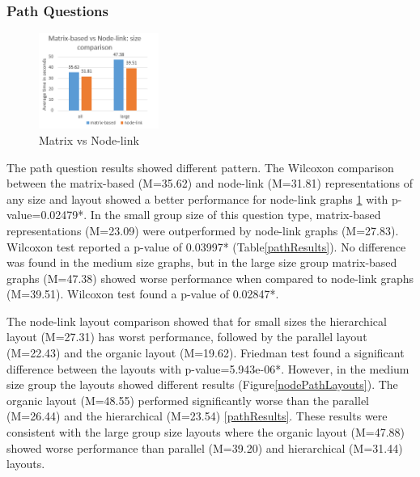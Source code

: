 \documentclass{l4proj}
\begin{document}
\subsubsection{Path Questions}

\begin{figure}
	\centering
	\vspace{-10mm}
    \includegraphics[width=0.35\textwidth]{images/pathComparison.PNG}
    \caption{Matrix vs Node-link} 
	\label{pathComparison}
\end{figure}

The path question results showed different pattern. The Wilcoxon comparison between the matrix-based (M=35.62) and node-link (M=31.81) representations of any size and layout showed a better performance for node-link graphs \ref{pathComparison} with p-value=0.02479*. In the small group size of this question type, matrix-based representations (M=23.09) were outperformed by node-link graphs (M=27.83). Wilcoxon test reported a p-value of 0.03997* (Table\ref{pathResults}). No difference was found in the medium size graphs, but in the large size group matrix-based graphs (M=47.38) showed worse performance when compared to node-link graphs (M=39.51). Wilcoxon test found a p-value of 0.02847*. 

The node-link layout comparison showed that for small sizes the hierarchical layout (M=27.31) has worst performance, followed by the parallel layout (M=22.43) and the organic layout (M=19.62). Friedman test found a significant difference between the layouts with p-value=5.943e-06*. However, in the medium size group the layouts showed different results (Figure\ref{nodePathLayouts}). The organic layout (M=48.55) performed significantly worse than the parallel (M=26.44) and the hierarchical (M=23.54) \ref{pathResults}. These results were consistent with the large group size layouts where the organic layout (M=47.88) showed worse performance than parallel (M=39.20) and hierarchical (M=31.44) layouts.
\end{document}
